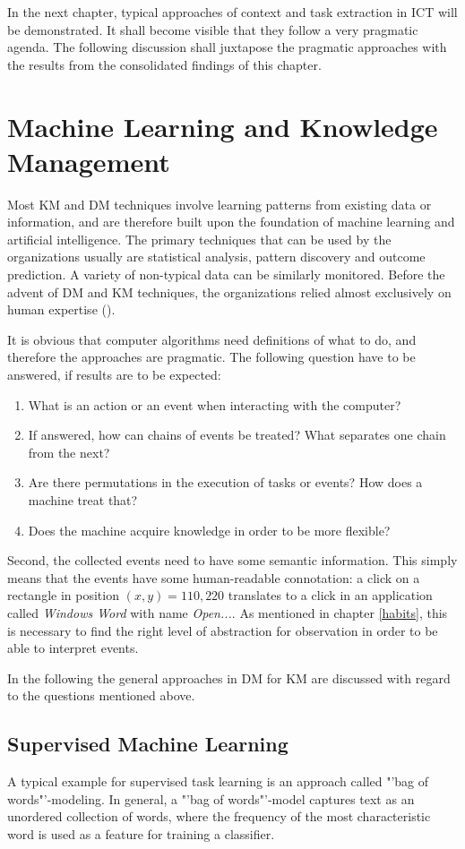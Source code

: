 In the next chapter, typical approaches of context and task extraction in \ac{ICT} will be demonstrated. It shall become visible that they follow a very pragmatic agenda. The following discussion shall juxtapose the pragmatic approaches with the results from the consolidated findings of this chapter.

\section{Machine Learning and Knowledge Management}
Most KM and \ac{DM} techniques involve learning patterns from existing data or information, and are therefore built upon the foundation of machine learning and artificial intelligence. The primary techniques that can be used by the organizations usually are statistical analysis, pattern discovery and outcome prediction. A variety of non-typical data can be similarly monitored. Before the advent of \acs{DM} and \acs{KM} techniques, the organizations relied almost exclusively on human expertise (\cite{tsai2012knowledge}). 

It is obvious that computer algorithms need definitions of what to do, and therefore the approaches are pragmatic. The following question have to be answered, if results are to be expected:
\begin{enumerate}
  \item What is an action or an event when interacting with the computer?
  \item If answered, how can chains of events be treated? What separates one chain from the next?
  \item Are there permutations in the execution of tasks or events? How does a machine treat that?
  \item Does the machine acquire knowledge in order to be more flexible?
\end{enumerate}
Second, the collected events need to have some semantic information. This simply means that the events have some human-readable connotation: a click on a rectangle in position $(x,y)=110,220$ translates to a click in an application called \textit{Windows Word} with name \textit{Open...}. As mentioned in chapter \ref{habits}, this is necessary to find the right level of abstraction for observation in order to be able to interpret events.

In the following the general approaches in \acs{DM} for \acs{KM} are discussed with regard to the questions mentioned above. 

\subsection{Supervised Machine Learning}
A typical example for supervised task learning is an approach called "'bag of words"'-modeling. In general, a "'bag of words"'-model captures text as an unordered collection of words, where the frequency of the most characteristic word is used as a feature for training a classifier. 

